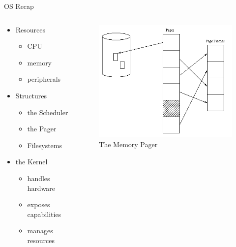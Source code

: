 \begin{frame}{OS Recap}
	\begin{columns}[T]
		\begin{column}{.5\textwidth}
			\begin{itemize}
			\item Resources
				\begin{itemize}
				\item CPU
				\item memory
				\item peripherals
				\end{itemize}
			\item Structures
				\begin{itemize}
				\item the Scheduler
				\item the Pager
				\item Filesystems
				\end{itemize}
			\item the Kernel
				\begin{itemize}
				\item handles hardware
				\item exposes capabilities
				\item manages resources
				\end{itemize}
			\end{itemize}
		\end{column}
		\begin{column}{.5\textwidth}
			\begin{figure}[ht]
				\vspace*{-0.7cm}
				\caption{The Memory Pager}
				\includegraphics[height=0.3\textheight]{img/pager.png}
			\end{figure}
			\begin{figure}[ht]

\end{figure}
\end{column}
\end{columns}
\end{frame}
